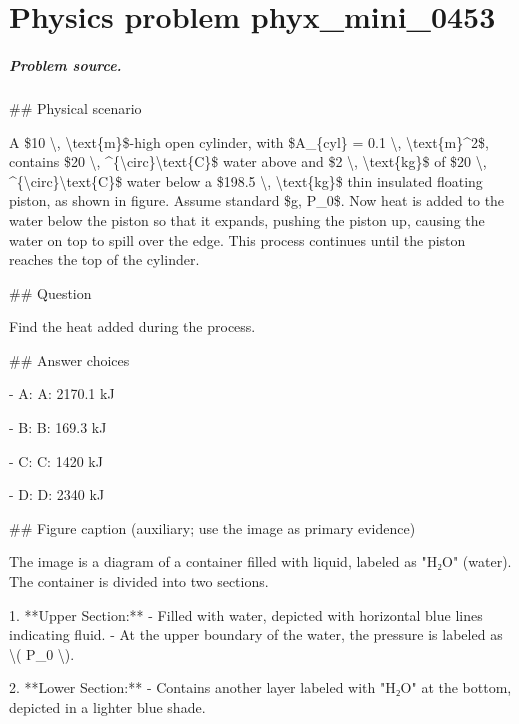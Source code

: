 
\chapter{Physics problem phyx\_mini\_0453}
\label{ch:PhyXMiniProblems_problem_phyx_mini_0453}

\paragraph{Problem source.}
\#\# Physical scenario

A \$10 \textbackslash{}, \textbackslash{}text\{m\}\$-high open cylinder, with \$A\_\{cyl\} = 0.1 \textbackslash{}, \textbackslash{}text\{m\}\textasciicircum{}2\$, contains \$20 \textbackslash{}, \textasciicircum{}\{\textbackslash{}circ\}\textbackslash{}text\{C\}\$ water above and \$2 \textbackslash{}, \textbackslash{}text\{kg\}\$ of \$20 \textbackslash{}, \textasciicircum{}\{\textbackslash{}circ\}\textbackslash{}text\{C\}\$ water below a \$198.5 \textbackslash{}, \textbackslash{}text\{kg\}\$ thin insulated floating piston, as shown in figure. Assume standard \$g, P\_0\$. Now heat is added to the water below the piston so that it expands, pushing the piston up, causing the water on top to spill over the edge. This process continues until the piston reaches the top of the cylinder.

\#\# Question

Find the heat added during the process.

\#\# Answer choices

- A: A: 2170.1 kJ

- B: B: 169.3 kJ

- C: C: 1420 kJ

- D: D: 2340 kJ

\#\# Figure caption (auxiliary; use the image as primary evidence)

The image is a diagram of a container filled with liquid, labeled as "H₂O" (water). The container is divided into two sections.

1. **Upper Section:**
   - Filled with water, depicted with horizontal blue lines indicating fluid.
   - At the upper boundary of the water, the pressure is labeled as \textbackslash{}( P\_0 \textbackslash{}).

2. **Lower Section:**
   - Contains another layer labeled with "H₂O" at the bottom, depicted in a lighter blue shade.


